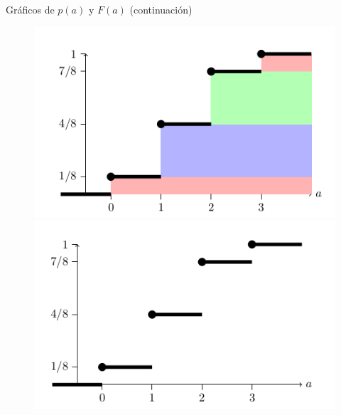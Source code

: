 \documentclass[10pt]{beamer}
\begin{document}
\begin{frame}{Gr\'aficos de $p(a)$ y $F(a)$ (continuaci\'on)}
\begin{figure}
	\centering
	\begin{minipage}{.5\textwidth}
		\centering
		\includegraphics[width=0.8\linewidth]{v4}
	\end{minipage}%
	\begin{minipage}{.5\textwidth}
		\centering
		\includegraphics[width=0.8\linewidth]{v5}
	\end{minipage}
\end{figure}

\vspace{0.2cm}


\end{frame}
\end{document}
